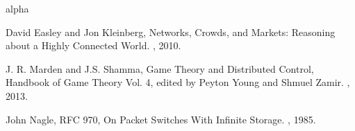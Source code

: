 \documentclass{article}
\begin{document}
\begin{thebibliography}
	{alpha}
	
	 David Easley and Jon Kleinberg, 
	\newblock Networks, Crowds, and Markets: Reasoning about a Highly Connected World. 
	, 2010.
	
	 J. R. Marden and J.S. Shamma, 
	\newblock Game Theory and Distributed Control, Handbook of Game Theory Vol. 4, edited by Peyton Young and Shmuel Zamir. 
	, 2013.
	
	 John Nagle, 
	\newblock RFC 970, On Packet Switches With Infinite Storage. 
	, 1985.
\end{thebibliography}
\end{document}
